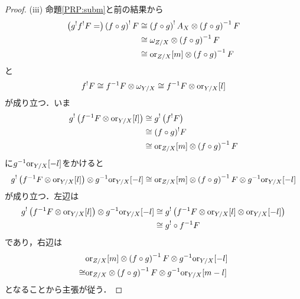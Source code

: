 \begin{proof}
    (iii) 
    命題\ref{PRP:subm}と前の結果から
    \begin{align*}
        \left(g^!f^!F=\right) 
        \left(f\circ g\right)^!F
        &\cong
        \left(f\circ g\right)^!A_X
        \otimes
        \left(f\circ g\right)^{-1}F\\
        &\cong
        \omega_{Z/X}
        \otimes
        \left(f\circ g\right)^{-1}F\\
        &\cong
        \mathord{\mathrm{or}}_{Z/X}[m]\otimes
        \left(f\circ g\right)^{-1}F
    \end{align*}
    と
    \begin{align*}
        f^!F
        \cong f^{-1}F\otimes \omega_{Y/X}
        \cong f^{-1}F\otimes \mathord{\mathrm{or}}_{Y/X}[l]
    \end{align*}
    が成り立つ．いま
    \begin{align*}
        g^!\left(f^{-1}F\otimes\mathord{\mathrm{or}}_{Y/X}[l]\right)
        &\cong
        g^!\left(f^!F\right)\\
        &\cong
        (f\circ g)^!F\\
        &\cong
        \mathord{\mathrm{or}}_{Z/X}[m]\otimes
        \left(f\circ g\right)^{-1}F
    \end{align*}
    に\(g^{-1}\mathord{\mathrm{or}}_{Y/X}[-l]\)をかけると
    \[
        g^!\left(f^{-1}F\otimes\mathord{\mathrm{or}}_{Y/X}[l]\right)
        \otimes g^{-1}\mathord{\mathrm{or}}_{Y/X}[-l]
        \cong
        \mathord{\mathrm{or}}_{Z/X}[m]\otimes\left(f\circ g\right)^{-1}F
        \otimes g^{-1}\mathord{\mathrm{or}}_{Y/X}[-l]
    \]
    が成り立つ．左辺は
    \begin{align*}
        g^!\left(f^{-1}F\otimes\mathord{\mathrm{or}}_{Y/X}[l]\right)
        \otimes g^{-1}\mathord{\mathrm{or}}_{Y/X}[-l]
        &\cong
        g^!\left(
            f^{-1}F\otimes\mathord{\mathrm{or}}_{Y/X}[l]\otimes\mathord{\mathrm{or}}_{Y/X}[-l]
        \right)\\
        &\cong
        g^!\circ f^{-1}F
    \end{align*}
    であり，右辺は\begin{align*}
        &\mathord{\mathrm{or}}_{Z/X}[m]\otimes\left(f\circ g\right)^{-1}F
        \otimes g^{-1}\mathord{\mathrm{or}}_{Y/X}[-l]\\
        \cong&
        \mathord{\mathrm{or}}_{Z/X}\otimes\left(f\circ g\right)^{-1}F
        \otimes g^{-1}\mathord{\mathrm{or}}_{Y/X}[m-l]
    \end{align*}
    となることから主張が従う．
\end{proof}


















